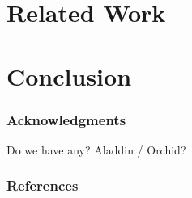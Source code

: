 \documentclass{article}
\begin{document}
\section{Related Work}




\section{Conclusion}



\subsubsection*{Acknowledgments}
Do we have any? Aladdin / Orchid?


\subsubsection*{References}
\renewcommand{\refname}{\vskip -0.75cm}  %

\small{

}
\end{document}
